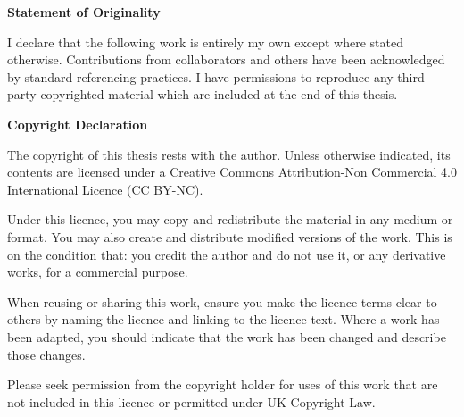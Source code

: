 \textbf{Statement of Originality}

I declare that the following work is entirely my own except where stated otherwise. Contributions from collaborators and others have been acknowledged by standard referencing practices. I have permissions to reproduce any third party copyrighted material which are included at the end of this thesis.

\textbf{Copyright Declaration}

The copyright of this thesis rests with the author. Unless otherwise indicated, its contents are licensed under a Creative Commons Attribution-Non Commercial 4.0 International Licence (CC BY-NC).

Under this licence, you may copy and redistribute the material in any medium or format. You may also create and distribute modified versions of the work. This is on the condition that: you credit the author and do not use it, or any derivative works, for a commercial purpose.

When reusing or sharing this work, ensure you make the licence terms clear to others by naming the licence and linking to the licence text. Where a work has been adapted, you should indicate that the work has been changed and describe those changes.

Please seek permission from the copyright holder for uses of this work that are not included in this licence or permitted under UK Copyright Law.